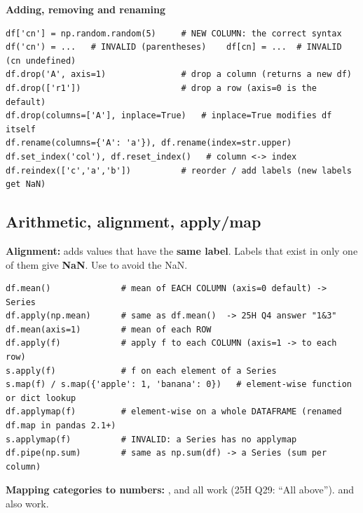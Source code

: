\textbf{Adding, removing and renaming}
\begin{codebox}
\begin{Verbatim}
df['cn'] = np.random.random(5)     # NEW COLUMN: the correct syntax
df('cn') = ...   # INVALID (parentheses)    df[cn] = ...  # INVALID (cn undefined)
df.drop('A', axis=1)               # drop a column (returns a new df)
df.drop(['r1'])                    # drop a row (axis=0 is the default)
df.drop(columns=['A'], inplace=True)   # inplace=True modifies df itself
df.rename(columns={'A': 'a'}), df.rename(index=str.upper)
df.set_index('col'), df.reset_index()   # column <-> index
df.reindex(['c','a','b'])          # reorder / add labels (new labels get NaN)
\end{Verbatim}
\end{codebox}

\subsection{Arithmetic, alignment, apply/map}
\textbf{Alignment:}  adds values that have the \textbf{same label}. Labels that exist in only one of them give \textbf{NaN}. Use  to avoid the NaN.

\begin{codebox}
\begin{Verbatim}
df.mean()              # mean of EACH COLUMN (axis=0 default) -> Series
df.apply(np.mean)      # same as df.mean()  -> 25H Q4 answer "1&3"
df.mean(axis=1)        # mean of each ROW
df.apply(f)            # apply f to each COLUMN (axis=1 -> to each row)
s.apply(f)             # f on each element of a Series
s.map(f) / s.map({'apple': 1, 'banana': 0})   # element-wise function or dict lookup
df.applymap(f)         # element-wise on a whole DATAFRAME (renamed df.map in pandas 2.1+)
s.applymap(f)          # INVALID: a Series has no applymap
df.pipe(np.sum)        # same as np.sum(df) -> a Series (sum per column)
\end{Verbatim}
\end{codebox}
\textbf{Mapping categories to numbers:} ,  and  all work (25H Q29: ``All above'').
 and  also work.

